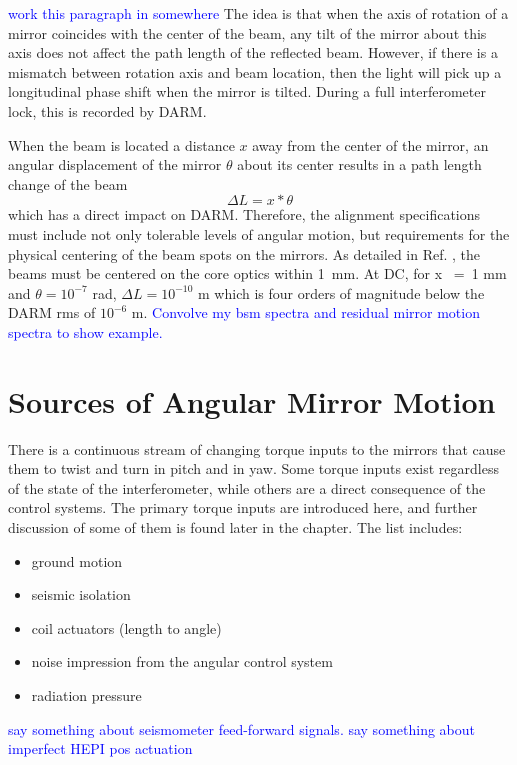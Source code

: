 \textcolor{blue}{work this paragraph in somewhere}
The idea is that when the axis of rotation of a mirror coincides with the center of the beam, any tilt of the mirror about this axis does not affect the path length of the reflected beam. However, if there is a mismatch between rotation axis and beam location, then the light will pick up a longitudinal phase shift when the mirror is tilted. During a full interferometer lock, this is recorded by DARM.



When the beam is located a distance $x$ away from the center of the mirror, an
angular displacement of the mirror $\theta$ about its center results in a path
length change of the beam
\begin{equation}
\Delta{L} = x * \theta
\end{equation}
which has a direct impact on DARM. Therefore, the alignment specifications must include not only tolerable levels of angular motion, but requirements for the physical centering of the beam spots on the mirrors. As detailed in Ref. \cite{ISCGroup1998ASC}, the beams must be centered on the core optics within 1~mm. At DC, for x ~=~1 mm and $\theta = 10^{-7}$ rad, $\Delta{L} = 10^{-10}$ m which is four orders of magnitude below the DARM rms of $10^{-6}$ m. \textcolor{blue}{Convolve my bsm spectra and residual mirror motion spectra to show example.}




\section{Sources of Angular Mirror Motion}
There is a continuous stream of changing torque inputs to the mirrors that cause them to twist and turn in pitch and in yaw. Some torque inputs exist regardless of the state of the interferometer, while others are a direct consequence of the control systems. The primary torque inputs are introduced here, and further discussion of some of them is found later in the chapter. The list includes:
\begin{itemize}
\item ground motion \vspace{-10pt} 
\item seismic isolation \vspace{-10pt} 
\item coil actuators (length to angle) \vspace{-10pt}
\item noise impression from the angular control system \vspace{-10pt}
\item radiation pressure
\end{itemize}
\textcolor{blue}{say something about seismometer feed-forward signals. say something about imperfect HEPI pos actuation}



